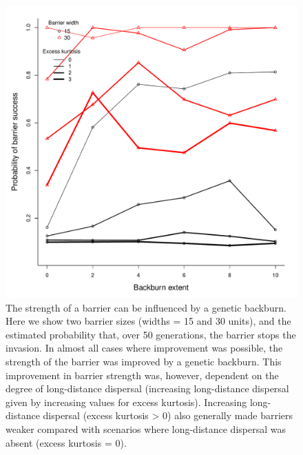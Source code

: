 \documentclass{article}
\begin{document}
 \begin{figure}[h!]
\begin{center}
\includegraphics[width=0.7\columnwidth]{BarSimsVarv.pdf}
\caption{\label{fig:varv}
The strength of a barrier can be influenced by a genetic backburn.  Here we show two barrier sizes (widths = 15 and 30 units), and the estimated probability that, over 50 generations, the barrier stops the invasion.  In almost all cases where improvement was possible, the strength of the barrier was improved by a genetic backburn.  This improvement in barrier strength was, however, dependent on the degree of long-distance dispersal (increasing long-distance dispersal given by increasing values for excess kurtosis).  Increasing long-distance dispersal (excess kurtosis > 0) also generally made barriers weaker compared with scenarios where long-distance dispersal was absent (excess kurtosis = 0).}
\end{center}
\end{figure}
\end{document}
